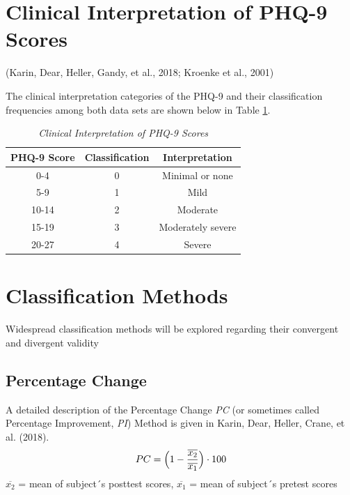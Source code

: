 \documentclass[12pt,twoside]{reedthesis}
\begin{document}
\hypertarget{clinical-interpretation-of-phq-9-scores}{%
\section{Clinical Interpretation of PHQ-9 Scores}\label{clinical-interpretation-of-phq-9-scores}}

(Karin, Dear, Heller, Gandy, et al., 2018; Kroenke et al., 2001)

\par

The clinical interpretation categories of the PHQ-9 and their classification frequencies among both data sets are shown below in Table \ref{tab:phq-int}.
\begin{table}[htb]
\vspace*{1.5em}
\begin{threeparttable}
  \caption{\textit{Clinical Interpretation of PHQ-9 Scores}}
  \label{tab:phq-int}
  \begin{tabular}{@{}ccc@{}}
  \toprule
  PHQ-9 Score & Classification & Interpretation\\ \midrule
  0-4 & 0 & Minimal or none\\
  5-9 & 1 & Mild\\
  10-14 & 2 & Moderate\\
  15-19 & 3 & Moderately severe\\
  20-27 & 4 & Severe\\
  \bottomrule
  \end{tabular}
  \end{threeparttable}
\end{table}
\hypertarget{class-methods}{%
\section{Classification Methods}\label{class-methods}}

Widespread classification methods will be explored regarding their convergent and divergent validity

\hypertarget{percentage-change}{%
\subsection{Percentage Change}\label{percentage-change}}

A detailed description of the Percentage Change \emph{PC} (or sometimes called Percentage Improvement, \emph{PI}) Method is given in Karin, Dear, Heller, Crane, et al. (2018).
\begin{equation}
PC = \Bigl(1 - \frac{\overline{x_{2}}} {\overline{x_{1}}}\Bigr) \cdot 100 \label{eq:pc}
\end{equation}
\noindent
\(\overline{x_{2}}\) = mean of subject´s posttest scores,
\(\overline{x_{1}}\) = mean of subject´s pretest scores
\end{document}
